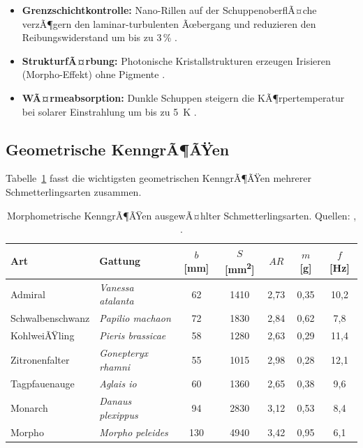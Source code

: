 ﻿\documentclass[a4paper,12pt]{article}
\theoremstyle{definition}
\begin{document}
	\begin{itemize}
		\item \textbf{Grenzschichtkontrolle:} Nano-Rillen auf der SchuppenoberflÃ¤che
		verzÃ¶gern den laminar-turbulenten Ãœbergang und reduzieren den Reibungswiderstand
		um bis zu 3\,\% \cite{chen2018butterfly}.
		\item \textbf{StrukturfÃ¤rbung:} Photonische Kristallstrukturen erzeugen Irisieren
		(Morpho-Effekt) ohne Pigmente \cite{vigneron2010morpho}.
		\item \textbf{WÃ¤rmeabsorption:} Dunkle Schuppen steigern die KÃ¶rpertemperatur
		bei solarer Einstrahlung um bis zu \SI{5}{\kelvin} \cite{clench1966flight}.
	\end{itemize}
	
	\subsection{Geometrische KenngrÃ¶ÃŸen}
	
	Tabelle~\ref{tab:geometrie} fasst die wichtigsten geometrischen KenngrÃ¶ÃŸen
	mehrerer Schmetterlingsarten zusammen.
	
	\begin{table}[H]
		\centering
		\caption{Morphometrische KenngrÃ¶ÃŸen ausgewÃ¤hlter Schmetterlingsarten.
			Quellen: \cite{betts1988wing}, \cite{jantzen2008wing}.}
		\label{tab:geometrie}
		\begin{tabular}{llccccc}
			\toprule
			Art & Gattung & $b$ [mm] & $S$ [\si{mm^2}] & $AR$ & $m$ [g] & $f$ [Hz]\\
			\midrule
			Admiral      & \textit{Vanessa atalanta}    & 62 & 1410 & 2{,}73 & 0{,}35 & 10{,}2\\
			Schwalbenschwanz & \textit{Papilio machaon}  & 72 & 1830 & 2{,}84 & 0{,}62 &  7{,}8\\
			KohlweiÃŸling & \textit{Pieris brassicae}    & 58 & 1280 & 2{,}63 & 0{,}29 & 11{,}4\\
			Zitronenfalter & \textit{Gonepteryx rhamni} & 55 & 1015 & 2{,}98 & 0{,}28 & 12{,}1\\
			Tagpfauenauge & \textit{Aglais io}          & 60 & 1360 & 2{,}65 & 0{,}38 &  9{,}6\\
			Monarch      & \textit{Danaus plexippus}    & 94 & 2830 & 3{,}12 & 0{,}53 &  8{,}4\\
			Morpho       & \textit{Morpho peleides}    & 130 & 4940 & 3{,}42 & 0{,}95 &  6{,}1\\
			\bottomrule
		\end{tabular}
	\end{table}
	
\end{document}
